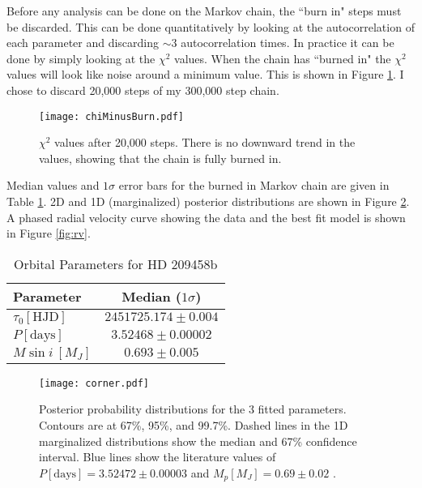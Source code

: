 \documentclass[11pt]{paper}
\begin{document}
Before any analysis can be done on the Markov chain, the ``burn in" steps must be discarded. This can be done quantitatively by looking at the autocorrelation of each parameter and discarding $\sim3$ autocorrelation times. In practice it can be done by simply looking at the $\chi^2$ values. When the chain has ``burned in" the $\chi^2$ values will look like noise around a minimum value. This is shown in Figure \ref{fig:chi}. I chose to discard 20,000 steps of my 300,000 step chain. 

\begin{figure}
\begin{center}
    \texttt{[image: chiMinusBurn.pdf]}
    \caption{$\chi^2$ values after 20,000 steps. There is no downward trend in the values, showing that the chain is fully burned in.}
    \label{fig:chi}
\end{center}
\end{figure}

Median values and $1\sigma$ error bars for the burned in Markov chain are given in Table \ref{tab:bf}. 2D and 1D (marginalized) posterior distributions are shown in Figure \ref{fig:corner}. A phased radial velocity curve showing the data and the best fit model is shown in Figure \ref{fig:rv}. 

\begin{table}
    \begin{center}
        \caption{Orbital Parameters for HD 209458b}\label{tab:bf}
        \begin{tabular}{lc}
            \hline\hline
            Parameter & Median ($1\sigma$) \\
            \hline
            $\tau_0 [\mathrm{HJD}]$ & $2451725.174\pm0.004$ \\
            $P [\mathrm{days}]$ & $3.52468\pm0.00002$ \\
            $M\sin i~[M_J]$ & $0.693\pm0.005$ \\
            \hline
        \end{tabular}
    \end{center}
\end{table}

\begin{figure}
\begin{center}
    \texttt{[image: corner.pdf]}
    \caption{Posterior probability distributions for the 3 fitted parameters. Contours are at 67\%, 95\%, and 99.7\%. Dashed lines in the 1D marginalized distributions show the median and 67\% confidence interval. Blue lines show the literature values of $P[\mathrm{days}]=3.52472\pm0.00003$ and $M_p[M_J]=0.69\pm0.02$ \citep{e}.}
    \label{fig:corner}
\end{center}
\end{figure}
\end{document}

